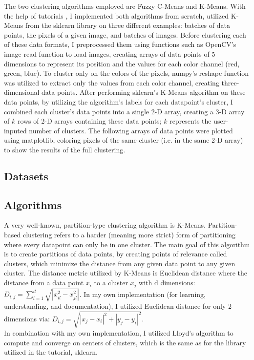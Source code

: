 \documentclass[10pt,twocolumn]{article}
\begin{document}
The two clustering algorithms employed are Fuzzy C-Means and K-Means. With the help of tutorials \cite{Khushijain2021,TheAcademician2020, Jordan2018,Aktas2021}, I implemented both algorithms from scratch, utilized K-Means from the sklearn library on three different examples: batches of data points, the pixels of a given image, and batches of images. Before clustering each of these data formats, I preprocessed them using functions such as OpenCV’s image read function to load images, creating arrays of data points of 5 dimensions to represent its position and the values for each color channel (red, green, blue). To cluster only on the colors of the pixels, numpy’s reshape function was utilized to extract only the values from each color channel, creating three-dimensional data points. After performing sklearn’s K-Means algorithm on these data points, by utilizing the algorithm’s labels for each datapoint’s cluster, I combined each cluster’s data points into a single 2-D array, creating a 3-D array of \(k\) rows of 2-D arrays containing these data points; \(k\) represents the user-inputed number of clusters. The following arrays of data points were plotted using matplotlib, coloring pixels of the same cluster (i.e. in the same 2-D array) to show the results of the full clustering. 

\subsection {Datasets}



\subsection {Algorithms}

\indent A very well-known, partition-type clustering algorithm is K-Means. Partition-based clustering refers to a harder (meaning more strict) form of partitioning where every datapoint can only be in one cluster. The main goal of this algorithm is to create partitions of data points, by creating points of relevance called clusters, which minimize the distance from any given data point to any given cluster. The distance metric utilized by K-Means is Euclidean distance where the distance from a data point \(x_i\) to a cluster \(x_j \) with d dimensions:
\(D_{i, j} = \sum_{l=1}^d \sqrt{|x_{il}^2 - x_{jl}^2|} \). In my own implementation (for learning, understanding, and documentation), I utilized Euclidean distance for only 2 dimensions via: \(D_{i, j} = \sqrt{{|x_{j} - x_{i}|^2} + {|y_{j} - y_{i}|^2}} \). \\ In combination with my own implementation, I utilized Lloyd’s algorithm to compute and converge on centers of clusters, which is the same as for the library utilized in the tutorial, sklearn.
\end{document}
